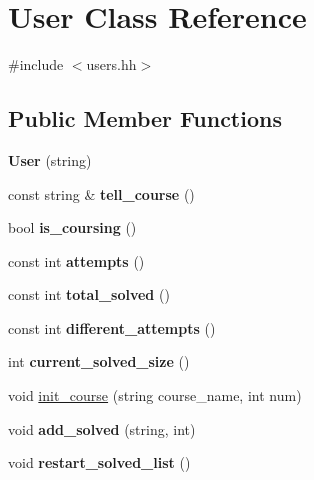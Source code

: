 \hypertarget{classUser}{}\section{User Class Reference}
\label{classUser}


{\ttfamily \#include $<$users.\+hh$>$}

\subsection*{Public Member Functions}
\begin{DoxyCompactItemize}
\item 
\mbox{\label{classUser_a5946ebad2c0daa3d21f00472e49dfc57}} 
{\bfseries User} (string)
\item 
\mbox{\label{classUser_a63a91b3461798e14971d3132e19f7f75}} 
const string \& {\bfseries tell\+\_\+course} ()
\item 
\mbox{\label{classUser_adaf1086e0b8809f0e865d0f9820c09b6}} 
bool {\bfseries is\+\_\+coursing} ()
\item 
\mbox{\label{classUser_a16fcf3b3df58ecbcc3590ab40985363a}} 
const int {\bfseries attempts} ()
\item 
\mbox{\label{classUser_a27ced419e01a1d65c01a84f1182ca746}} 
const int {\bfseries total\+\_\+solved} ()
\item 
\mbox{\label{classUser_a23c4fb1632f1fce2d65a6da9fccfc5dc}} 
const int {\bfseries different\+\_\+attempts} ()
\item 
\mbox{\label{classUser_a61c9d2b9224d92d9bcb3d2acd091efce}} 
int {\bfseries current\+\_\+solved\+\_\+size} ()
\item 
void \hyperlink{classUser_a0957a99d28d9485ff02889c4ab91996c}{init\+\_\+course} (string course\+\_\+name, int num)
\item 
\mbox{\label{classUser_a100a95d7eea360180c9178be41ba9c72}} 
void {\bfseries add\+\_\+solved} (string, int)
\item 
\mbox{\label{classUser_a4f31eae433791cc8372595d83fde36c7}} 
void {\bfseries restart\+\_\+solved\+\_\+list} ()
\end{DoxyCompactItemize}
